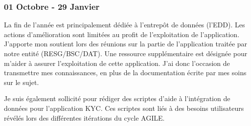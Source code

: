 \subsubsection*{01 Octobre - 29 Janvier}
\par
La fin de l’année est principalement dédiée à l’entrepôt de données (l’EDD). Les actions d’amélioration sont limitées au profit de l’exploitation de l’application. J’apporte mon soutient lors des réunions sur la partie de l’application traitée par notre entité (RESG/BSC/DAT). Une ressource supplémentaire est désignée pour m’aider à assurer l’exploitation de cette application. J’ai donc l’occasion de transmettre mes connaissances, en plus de la documentation écrite par mes soins sur le sujet.
\par
Je suis également sollicité pour rédiger des scriptes d’aide à l’intégration de données pour l’application KYC. Ces scriptes sont liés à des besoins utilisateurs révélés lors des différentes itérations du cycle AGILE.